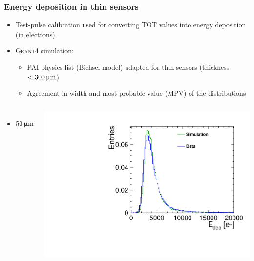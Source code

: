 \begin{frame}
  \frametitle{Energy deposition in thin sensors}

  \begin{itemize}
  \item Test-pulse calibration used for converting TOT values into
    energy deposition (in electrons).
  \item \textsc{Geant4} simulation:
    \begin{itemize} 
    \item PAI physics list (Bichsel model) adapted for thin
      sensors (thickness$<300\,\upmu\mathrm{m}$)
    \item Agreement in width and most-probable-value (MPV) of the distributions 
    \end{itemize}
  \end{itemize}

  \begin{columns}
    \begin{itemize}
    \item $50\,\upmu\mathrm{m}$
    \end{itemize}
    \centering
    \includegraphics[width=\textwidth]{../figures/TestBeam/50micron_Edep.pdf}


\end{columns}
\end{frame}
